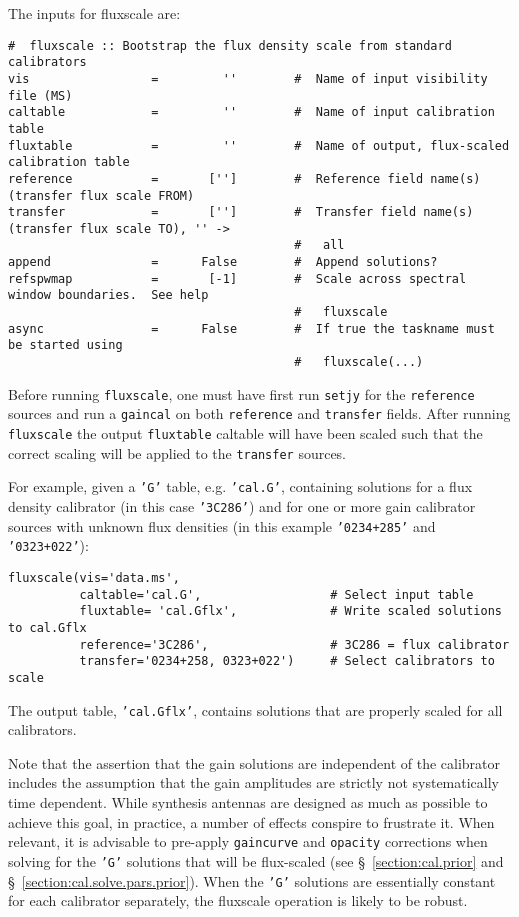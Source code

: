 The inputs for fluxscale are:
\small
\begin{verbatim}
#  fluxscale :: Bootstrap the flux density scale from standard calibrators
vis                 =         ''        #  Name of input visibility file (MS)
caltable            =         ''        #  Name of input calibration table
fluxtable           =         ''        #  Name of output, flux-scaled calibration table
reference           =       ['']        #  Reference field name(s) (transfer flux scale FROM)
transfer            =       ['']        #  Transfer field name(s) (transfer flux scale TO), '' ->
                                        #   all
append              =      False        #  Append solutions?
refspwmap           =       [-1]        #  Scale across spectral window boundaries.  See help
                                        #   fluxscale
async               =      False        #  If true the taskname must be started using
                                        #   fluxscale(...)
\end{verbatim}
\normalsize

Before running {\tt fluxscale}, one must have first run {\tt setjy} for the
{\tt reference} sources and run a {\tt gaincal} on both {\tt reference}
and {\tt transfer} fields.  After running {\tt fluxscale} the output
{\tt fluxtable} caltable will have been scaled such that the correct
scaling will be applied to the {\tt transfer} sources.

For example, given a {\tt 'G'} table, e.g. {\tt 'cal.G'},
containing solutions for a flux density calibrator (in this case 
{\tt '3C286'}) and for one or more gain calibrator sources with
unknown flux densities (in this example {\tt '0234+285'} and 
{\tt '0323+022'}):
\small
\begin{verbatim}
fluxscale(vis='data.ms',
          caltable='cal.G',                  # Select input table
          fluxtable= 'cal.Gflx',             # Write scaled solutions to cal.Gflx
          reference='3C286',                 # 3C286 = flux calibrator
          transfer='0234+258, 0323+022')     # Select calibrators to scale
\end{verbatim}
\normalsize
The output table, {\tt 'cal.Gflx'}, contains solutions that are properly scaled
for all calibrators.

Note that the assertion that the gain solutions are independent of the
calibrator includes the assumption that the gain amplitudes are
strictly not systematically time dependent.  While synthesis antennas
are designed as much as possible to achieve this goal, in practice, a
number of effects conspire to frustrate it.  When relevant, it is
advisable to pre-apply {\tt gaincurve} and {\tt opacity} 
corrections when solving
for the {\tt 'G'} solutions that will be flux-scaled (see 
\S~\ref{section:cal.prior} and \S~\ref{section:cal.solve.pars.prior}).
When the {\tt 'G'} solutions are essentially constant for each
calibrator separately, the fluxscale operation is likely to be robust.

